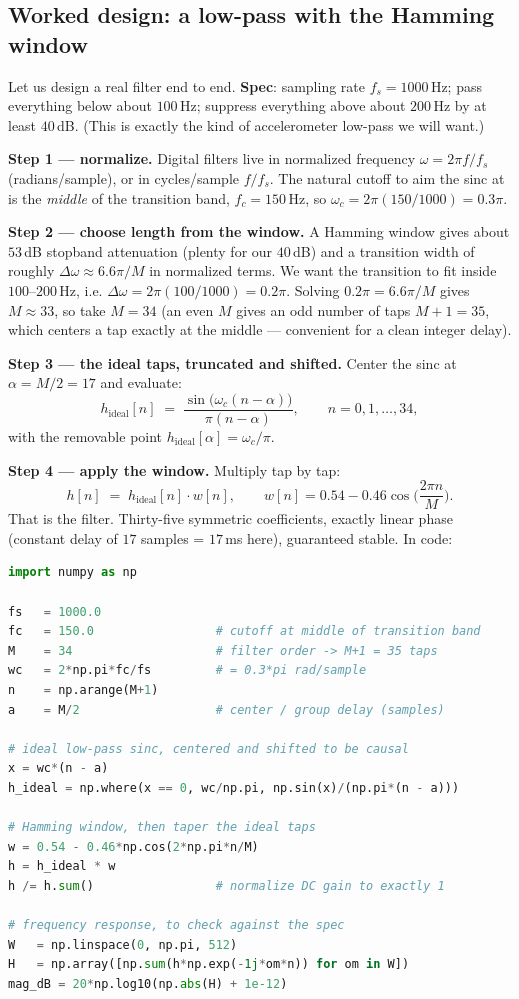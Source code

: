 \subsection{Worked design: a low-pass with the Hamming window}
\label{ch16:worked-fir}

Let us design a real filter end to end. \textbf{Spec}: sampling rate
$f_s = 1000$\,Hz; pass everything below about $100$\,Hz; suppress everything above
about $200$\,Hz by at least $40$\,dB. (This is exactly the kind of accelerometer
low-pass we will want.)

\textbf{Step 1 --- normalize.} Digital filters live in normalized frequency
$\omega = 2\pi f / f_s$ (radians/sample), or in cycles/sample $f/f_s$. The natural
cutoff to aim the sinc at is the \emph{middle} of the transition band,
$f_c = 150$\,Hz, so $\omega_c = 2\pi (150/1000) = 0.3\pi$.

\textbf{Step 2 --- choose length from the window.} A Hamming window gives about
$53$\,dB stopband attenuation (plenty for our $40$\,dB) and a transition width of
roughly $\Delta\omega \approx 6.6\pi/M$ in normalized terms. We want the
transition to fit inside $100$--$200$\,Hz, i.e.
$\Delta\omega = 2\pi(100/1000) = 0.2\pi$. Solving $0.2\pi = 6.6\pi/M$ gives
$M \approx 33$, so take $M=34$ (an even $M$ gives an odd number of taps $M+1=35$,
which centers a tap exactly at the middle --- convenient for a clean integer
delay).

\textbf{Step 3 --- the ideal taps, truncated and shifted.} Center the sinc at
$\alpha = M/2 = 17$ and evaluate:
\[
h_{\text{ideal}}[n] \;=\; \frac{\sin\!\big(\omega_c (n-\alpha)\big)}{\pi (n-\alpha)},
\qquad n = 0, 1, \dots, 34,
\]
with the removable point $h_{\text{ideal}}[\alpha] = \omega_c/\pi$.

\textbf{Step 4 --- apply the window.} Multiply tap by tap:
\[
h[n] \;=\; h_{\text{ideal}}[n]\cdot w[n], \qquad
w[n] = 0.54 - 0.46\cos\!\Big(\frac{2\pi n}{M}\Big).
\]
That is the filter. Thirty-five symmetric coefficients, exactly linear phase
(constant delay of $17$ samples = $17$\,ms here), guaranteed stable. In code:

\begin{lstlisting}[language=Python]
import numpy as np

fs   = 1000.0
fc   = 150.0                 # cutoff at middle of transition band
M    = 34                    # filter order -> M+1 = 35 taps
wc   = 2*np.pi*fc/fs         # = 0.3*pi rad/sample
n    = np.arange(M+1)
a    = M/2                   # center / group delay (samples)

# ideal low-pass sinc, centered and shifted to be causal
x = wc*(n - a)
h_ideal = np.where(x == 0, wc/np.pi, np.sin(x)/(np.pi*(n - a)))

# Hamming window, then taper the ideal taps
w = 0.54 - 0.46*np.cos(2*np.pi*n/M)
h = h_ideal * w
h /= h.sum()                 # normalize DC gain to exactly 1

# frequency response, to check against the spec
W   = np.linspace(0, np.pi, 512)
H   = np.array([np.sum(h*np.exp(-1j*om*n)) for om in W])
mag_dB = 20*np.log10(np.abs(H) + 1e-12)
\end{lstlisting}

